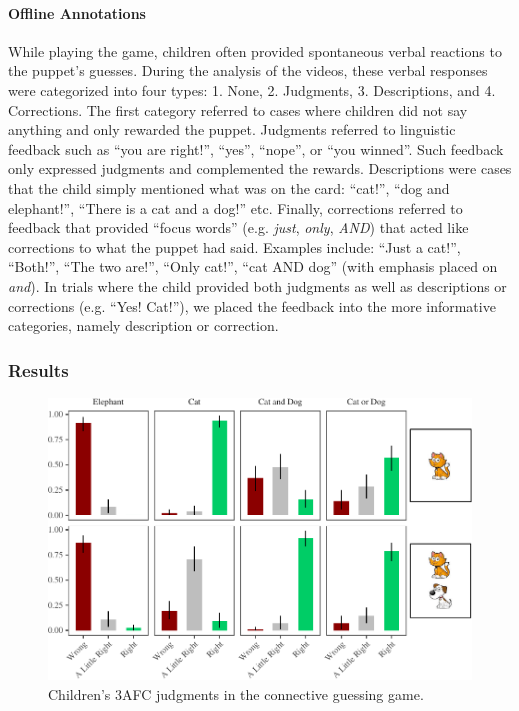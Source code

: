 \documentclass[floatsintext,man]{apa6}
\theoremstyle{definition}
\theoremstyle{definition}
\theoremstyle{definition}
\theoremstyle{remark}
\begin{document}
\paragraph{Offline Annotations}\label{feedbackCoding}

While playing the game, children often provided spontaneous verbal
reactions to the puppet's guesses. During the analysis of the videos,
these verbal responses were categorized into four types: 1. None, 2.
Judgments, 3. Descriptions, and 4. Corrections. The first category
referred to cases where children did not say anything and only rewarded
the puppet. Judgments referred to linguistic feedback such as
\enquote{you are right!}, \enquote{yes}, \enquote{nope}, or \enquote{you
winned}. Such feedback only expressed judgments and complemented the
rewards. Descriptions were cases that the child simply mentioned what
was on the card: \enquote{cat!}, \enquote{dog and elephant!},
\enquote{There is a cat and a dog!} etc. Finally, corrections referred
to feedback that provided \enquote{focus words} (e.g. \emph{just},
\emph{only}, \emph{AND}) that acted like corrections to what the puppet
had said. Examples include: \enquote{Just a cat!}, \enquote{Both!},
\enquote{The two are!}, \enquote{Only cat!}, \enquote{cat AND dog} (with
emphasis placed on \emph{and}). In trials where the child provided both
judgments as well as descriptions or corrections (e.g. \enquote{Yes!
Cat!}), we placed the feedback into the more informative categories,
namely description or correction.

\subsubsection{Results}\label{results-1}

\begin{figure}
\centering
\includegraphics{figs/childrenTernaryPlot-1.pdf}
\caption{\label{fig:childrenTernaryPlot}Children's 3AFC judgments in the
connective guessing game.}
\end{figure}
\end{document}
